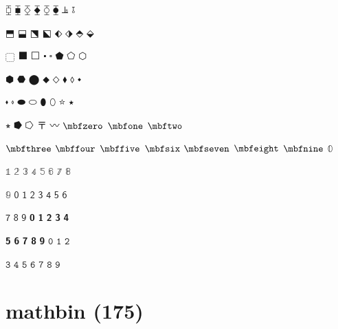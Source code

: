 \documentclass{article}
\begin{document}
$\errbarsquare$ $\errbarblacksquare$ $\errbardiamond$ $\errbarblackdiamond$ $\errbarcircle$ $\errbarblackcircle$ $\perps$ $\topcir$ \par
$\squaretopblack$ $\squarebotblack$ $\squareurblack$ $\squarellblack$ $\diamondleftblack$ $\diamondrightblack$ $\diamondtopblack$ $\diamondbotblack$ \par
$\dottedsquare$ $\lgblksquare$ $\lgwhtsquare$ $\vysmblksquare$ $\vysmwhtsquare$ $\pentagonblack$ $\pentagon$ $\varhexagon$ \par
$\varhexagonblack$ $\hexagonblack$ $\lgblkcircle$ $\mdblkdiamond$ $\mdwhtdiamond$ $\mdblklozenge$ $\mdwhtlozenge$ $\smblkdiamond$ \par
$\smblklozenge$ $\smwhtlozenge$ $\blkhorzoval$ $\whthorzoval$ $\blkvertoval$ $\whtvertoval$ $\medwhitestar$ $\medblackstar$ \par
$\smwhitestar$ $\rightpentagonblack$ $\rightpentagon$ $\postalmark$ $\hzigzag$ $\mbfzero$ $\mbfone$ $\mbftwo$ \par
$\mbfthree$ $\mbffour$ $\mbffive$ $\mbfsix$ $\mbfseven$ $\mbfeight$ $\mbfnine$ $\Bbbzero$ \par
$\Bbbone$ $\Bbbtwo$ $\Bbbthree$ $\Bbbfour$ $\Bbbfive$ $\Bbbsix$ $\Bbbseven$ $\Bbbeight$ \par
$\Bbbnine$ $\msanszero$ $\msansone$ $\msanstwo$ $\msansthree$ $\msansfour$ $\msansfive$ $\msanssix$ \par
$\msansseven$ $\msanseight$ $\msansnine$ $\mbfsanszero$ $\mbfsansone$ $\mbfsanstwo$ $\mbfsansthree$ $\mbfsansfour$ \par
$\mbfsansfive$ $\mbfsanssix$ $\mbfsansseven$ $\mbfsanseight$ $\mbfsansnine$ $\mttzero$ $\mttone$ $\mtttwo$ \par
$\mttthree$ $\mttfour$ $\mttfive$ $\mttsix$ $\mttseven$ $\mtteight$ $\mttnine$\par

\section*{mathbin (175)}
\end{document}
